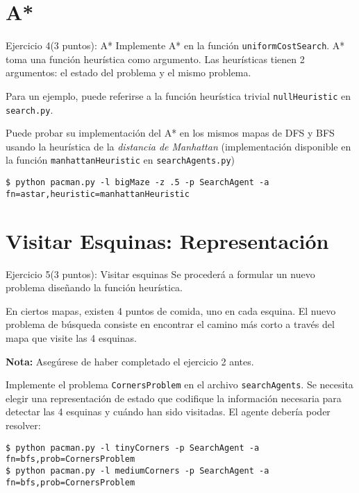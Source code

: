 \documentclass[10pt]{beamer}
\begin{document}
\section{A*}
\begin{frame}[fragile]{Ejercicio 4(3 puntos): A*}
Implemente A* en la función \texttt{uniformCostSearch}. A* toma una función heurística como 
argumento. Las heurísticas tienen 2 argumentos: el estado del problema y el mismo problema.

Para un ejemplo, puede referirse a la función heurística trivial \texttt{nullHeuristic} en
\texttt{search.py}.

Puede probar su implementación del A* en los mismos mapas de DFS y BFS usando la heurística 
de la \textit{distancia de Manhattan} (implementación disponible en la función \texttt{manhattanHeuristic}
en \texttt{searchAgents.py})

\begin{lstlisting}
$ python pacman.py -l bigMaze -z .5 -p SearchAgent -a fn=astar,heuristic=manhattanHeuristic
\end{lstlisting}

\end{frame}


\section{Visitar Esquinas: Representación}

\begin{frame}[fragile]{Ejercicio 5(3 puntos): Visitar esquinas}
Se procederá a formular un nuevo problema diseñando la función heurística.

En ciertos mapas, existen 4 puntos de comida, uno en cada esquina. El 
nuevo problema de búsqueda consiste en encontrar el camino más corto 
a través del mapa que visite las 4 esquinas.

\textbf{Nota:} Asegúrese de haber completado el ejercicio 2 antes.

Implemente el problema \texttt{CornersProblem} en el archivo \texttt{searchAgents}.
Se necesita elegir una representación de estado que codifique la información necesaria 
para detectar las 4 esquinas y cuándo han sido visitadas. El agente debería poder resolver:

\begin{lstlisting}
$ python pacman.py -l tinyCorners -p SearchAgent -a fn=bfs,prob=CornersProblem
$ python pacman.py -l mediumCorners -p SearchAgent -a fn=bfs,prob=CornersProblem
\end{lstlisting}

\end{frame}
\end{document}
